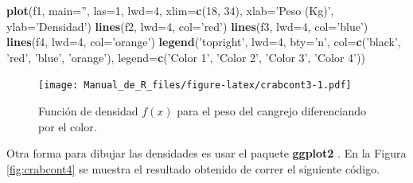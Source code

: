 \documentclass[10pt,]{krantz}
\makeatletter
\newenvironment{Shaded}{\begin{snugshade}}{\end{snugshade}}
\newcommand{\KeywordTok}[1]{\textcolor[rgb]{0.13,0.29,0.53}{\textbf{{#1}}}}
\newcommand{\DataTypeTok}[1]{\textcolor[rgb]{0.13,0.29,0.53}{{#1}}}
\newcommand{\DecValTok}[1]{\textcolor[rgb]{0.00,0.00,0.81}{{#1}}}
\newcommand{\FloatTok}[1]{\textcolor[rgb]{0.00,0.00,0.81}{{#1}}}
\newcommand{\StringTok}[1]{\textcolor[rgb]{0.31,0.60,0.02}{{#1}}}
\newcommand{\CommentTok}[1]{\textcolor[rgb]{0.56,0.35,0.01}{\textit{{#1}}}}
\newcommand{\NormalTok}[1]{{#1}}
\newenvironment{kframe}{%
\medskip{}
\setlength{\fboxsep}{.8em}
 \def\at@end@of@kframe{}%
 \ifinner\ifhmode%
  \def\at@end@of@kframe{\end{minipage}}%
  \begin{minipage}{\columnwidth}%
 \fi\fi%
 \def\FrameCommand##1{\hskip\@totalleftmargin \hskip-\fboxsep
 \colorbox{shadecolor}{##1}\hskip-\fboxsep
     \hskip-\linewidth \hskip-\@totalleftmargin \hskip\columnwidth}%
 \MakeFramed {\advance\hsize-\width
   \@totalleftmargin\z@ \linewidth\hsize
   \@setminipage}}%
 {\par\unskip\endMakeFramed%
 \at@end@of@kframe}
\renewenvironment{Shaded}{\begin{kframe}}{\end{kframe}}
\makeatother
\begin{document}
\begin{Shaded}
\begin{Highlighting}[]
\KeywordTok{plot}\NormalTok{(f1, }\DataTypeTok{main=}\StringTok{''}\NormalTok{, }\DataTypeTok{las=}\DecValTok{1}\NormalTok{, }\DataTypeTok{lwd=}\DecValTok{4}\NormalTok{,}
     \DataTypeTok{xlim=}\KeywordTok{c}\NormalTok{(}\DecValTok{18}\NormalTok{, }\DecValTok{34}\NormalTok{),}
     \DataTypeTok{xlab=}\StringTok{'Peso (Kg)'}\NormalTok{, }\DataTypeTok{ylab=}\StringTok{'Densidad'}\NormalTok{)}
\KeywordTok{lines}\NormalTok{(f2, }\DataTypeTok{lwd=}\DecValTok{4}\NormalTok{, }\DataTypeTok{col=}\StringTok{'red'}\NormalTok{)}
\KeywordTok{lines}\NormalTok{(f3, }\DataTypeTok{lwd=}\DecValTok{4}\NormalTok{, }\DataTypeTok{col=}\StringTok{'blue'}\NormalTok{)}
\KeywordTok{lines}\NormalTok{(f4, }\DataTypeTok{lwd=}\DecValTok{4}\NormalTok{, }\DataTypeTok{col=}\StringTok{'orange'}\NormalTok{)}
\KeywordTok{legend}\NormalTok{(}\StringTok{'topright'}\NormalTok{, }\DataTypeTok{lwd=}\DecValTok{4}\NormalTok{, }\DataTypeTok{bty=}\StringTok{'n'}\NormalTok{,}
       \DataTypeTok{col=}\KeywordTok{c}\NormalTok{(}\StringTok{'black'}\NormalTok{, }\StringTok{'red'}\NormalTok{, }\StringTok{'blue'}\NormalTok{, }\StringTok{'orange'}\NormalTok{),}
       \DataTypeTok{legend=}\KeywordTok{c}\NormalTok{(}\StringTok{'Color 1'}\NormalTok{, }\StringTok{'Color 2'}\NormalTok{, }\StringTok{'Color 3'}\NormalTok{, }\StringTok{'Color 4'}\NormalTok{))}
\end{Highlighting}
\end{Shaded}

\begin{figure}[htbp]
\centering
\texttt{[image: Manual\_de\_R\_files/figure-latex/crabcont3-1.pdf]}
\caption{\label{fig:crabcont3}Función de densidad \(f(x)\) para el peso del
cangrejo diferenciando por el color.}
\end{figure}

Otra forma para dibujar las densidades es usar el paquete
\textbf{ggplot2} \citep{R-ggplot2}. En la Figura \ref{fig:crabcont4} se
muestra el resultado obtenido de correr el siguiente código.

\begin{Shaded}
\end{Shaded}
\end{document}

